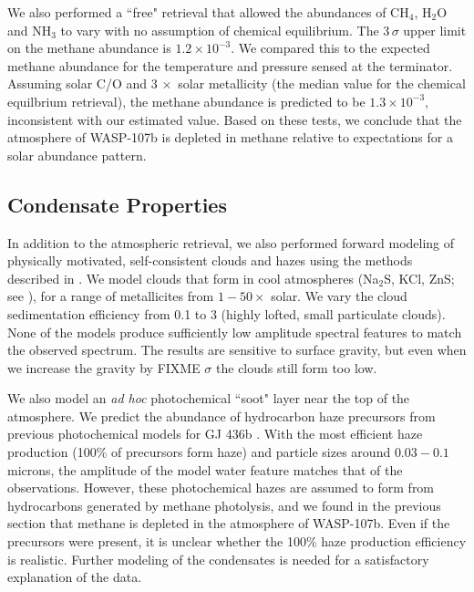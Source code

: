 \documentclass[twocolumn]{aastex61}
\begin{document}
We also performed a ``free" retrieval that allowed the abundances of CH$_4$, H$_2$O and NH$_3$ to vary with no assumption of chemical equilibrium. The $3\,\sigma$ upper limit on the methane abundance is $1.2\times10^{-3}$. We compared this to the expected methane abundance for the temperature and pressure sensed at the terminator.  Assuming  solar C/O and $3\,\times$ solar metallicity (the median value for the chemical equilbrium retrieval), the methane abundance is predicted to be $1.3\times10^{-3}$, inconsistent with our estimated value.  Based on these tests, we conclude that the atmosphere of WASP-107b is depleted in methane relative to expectations for a solar abundance pattern.

\subsection{Condensate Properties}
In addition to the atmospheric retrieval, we also performed forward modeling of physically motivated, self-consistent clouds and hazes using the methods described in \cite{fortney08, morley15}.  We model clouds that form in cool atmospheres (Na$_2$S, KCl, ZnS; see \citealt{morley12}), for a range of metallicites from $1-50\times$ solar. We vary the cloud sedimentation efficiency from 0.1 to 3 (highly lofted, small particulate clouds). None of the models produce sufficiently low amplitude spectral features to match the observed spectrum. The results are sensitive to surface gravity, but even when we increase the gravity by FIXME $\sigma$ the clouds still form too low.

We also model an \emph{ad hoc} photochemical ``soot" layer near the top of the atmosphere. We predict the abundance of hydrocarbon haze precursors from previous photochemical models for GJ 436b \citep{line11, morley17}. With the most efficient haze production (100\% of precursors form haze) and particle sizes around $0.03-0.1$ microns, the amplitude of the model water feature matches that of the observations. However, these photochemical hazes are assumed to form from hydrocarbons generated by methane photolysis, and we found in the previous section that methane is depleted in the atmosphere of WASP-107b.  Even if the precursors were present, it is unclear whether the 100\% haze production efficiency is realistic. Further modeling of the condensates is needed for a satisfactory explanation of the data.

\end{document}
